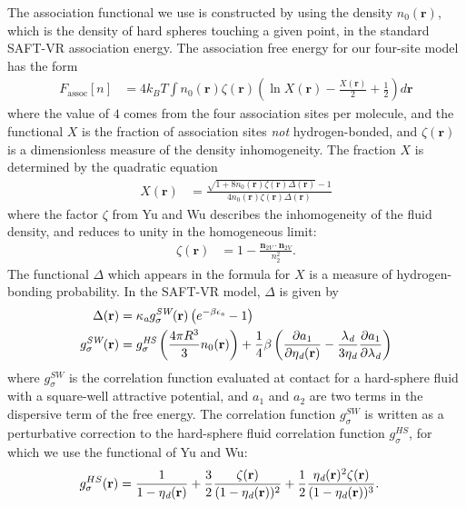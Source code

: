 \documentclass[letterpaper,twocolumn,amsmath,amssymb,prb]{revtex4-1}
\newcommand{\xx}{\textbf{r}}
\begin{document}
The association functional we use is constructed by using the density
$n_0(\xx)$, which is the density of hard spheres touching a given
point, in the standard SAFT-VR association
energy\cite{gil-villegas-1997-SAFT-VR}.
The association free energy for our four-site model has the form
\begin{align}
  F_\text{assoc}[n] &= 4 k_BT \int n_0(\xx) \zeta(\xx)
  \left(\ln X(\xx) - \frac{X(\xx)}{2} + \frac12\right) d\xx
\end{align}
where the value of $4$ comes from the four association sites per
molecule, and the functional $X$ is the fraction of association sites
\emph{not} hydrogen-bonded, and $\zeta(\xx)$ is a dimensionless
measure of the density inhomogeneity.
%
The fraction $X$ is determined by the quadratic equation
\begin{align}
  X(\xx) &= \frac{\sqrt{1 + 8n_0(\xx)\zeta(\xx)
      \Delta(\xx)} - 1}
  {4 n_0(\xx)\zeta(\xx)
    \Delta(\xx)}
\end{align}
where the factor $\zeta$ from Yu and
Wu\cite{yu2002fmt-dft-inhomogeneous-associating} describes the
inhomogeneity of the fluid density, and reduces to unity in the
homogeneous limit:
\begin{align}
  \zeta(\xx) &= 1 - \frac{\mathbf{n}_{2V}\cdot\mathbf{n}_{2V}}{n_2^2}.
\end{align}
The functional $\Delta$ which appears in the formula for $X$ is a
measure of hydrogen-bonding probability.  In the SAFT-VR
model\cite{gil-villegas-1997-SAFT-VR}, $\Delta$ is given by
\begin{align}
  \Delta(\xx) &= \kappaassoc g^\textit{SW}_\sigma(\xx)
  \left(e^{-\beta\epsilonassoc} - 1\right) \\
  g^\textit{SW}_\sigma(\xx) &= g^\textit{HS}_\sigma\left(\frac{4\pi R^3}{3}n_0(\xx)\right) +
  \frac{1}{4}\beta\left(\frac{\partial a_1}{\partial \etadisp(\xx)} -
  \frac{\lambdadisp}{3 \etadisp}\frac{\partial a_1}{\partial \lambdadisp}\right)\label{eq:gSW}
\end{align}
where $g^\textit{SW}_\sigma$ is the correlation function evaluated at
contact for a hard-sphere fluid with a square-well attractive
potential, and $a_1$ and $a_2$ are two terms in the dispersive term of
the free energy.  The correlation function $g^\textit{SW}_\sigma$ is
written as a perturbative correction to the hard-sphere fluid correlation
function $g^\textit{HS}_\sigma$, for which we use the functional of Yu and
Wu\cite{yu2002fmt-dft-inhomogeneous-associating}:
\begin{align}
  g_\sigma^{HS}(\xx) &= \frac{1}{1-\etadisp(\xx)}
  +\frac32\frac{\zeta(\xx)}{(1-\etadisp(\xx))^2}
  + \frac12\frac{\etadisp(\xx)^2\zeta(\xx)}{(1-\etadisp(\xx))^3}.
\end{align}
\end{document}
